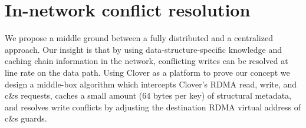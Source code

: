 

\section{In-network conflict resolution}

We propose a middle ground between a fully distributed and a
centralized approach.  Our insight is that by using
data-structure-specific knowledge and caching chain information in the
network, conflicting writes can be resolved at line rate on the data
path.  Using Clover as a platform to prove our concept we design a
middle-box algorithm which intercepts Clover's RDMA read,
write, and c\&s requests, caches a small amount (64 bytes per key) of
structural metadata, and resolves write conflicts by adjusting the
destination RDMA virtual address of c\&s guards.



